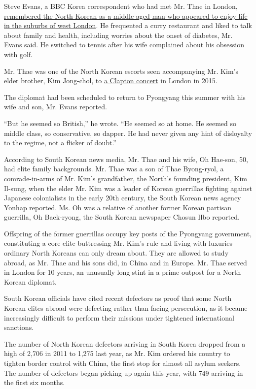 Steve Evans, a BBC Korea correspondent who had met Mr. Thae in London,
\href{http://www.bbc.com/news/magazine-37098904}{remembered the North
Korean as a middle-aged man who appeared to enjoy life in the suburbs of
west London}. He frequented a curry restaurant and liked to talk about
family and health, including worries about the onset of diabetes, Mr.
Evans said. He switched to tennis after his wife complained about his
obsession with golf.

Mr. Thae was one of the North Korean escorts seen accompanying Mr. Kim's
elder brother, Kim Jong-chol, to
\href{http://www.bbc.com/news/world-asia-32843186}{a Clapton concert} in
London in 2015.

The diplomat had been scheduled to return to Pyongyang this summer with
his wife and son, Mr. Evans reported.

``But he seemed so British,'' he wrote. ``He seemed so at home. He
seemed so middle class, so conservative, so dapper. He had never given
any hint of disloyalty to the regime, not a flicker of doubt.''

According to South Korean news media, Mr. Thae and his wife, Oh Hae-son,
50, had elite family backgrounds. Mr. Thae was a son of Thae Byong-ryol,
a comrade-in-arms of Mr. Kim's grandfather, the North's founding
president, Kim Il-sung, when the elder Mr. Kim was a leader of Korean
guerrillas fighting against Japanese colonialists in the early 20th
century, the South Korean news agency Yonhap reported. Ms. Oh was a
relative of another former Korean partisan guerrilla, Oh Baek-ryong, the
South Korean newspaper Chosun Ilbo reported.

Offspring of the former guerrillas occupy key posts of the Pyongyang
government, constituting a core elite buttressing Mr. Kim's rule and
living with luxuries ordinary North Koreans can only dream about. They
are allowed to study abroad, as Mr. Thae and his sons did, in China and
in Europe. Mr. Thae served in London for 10 years, an unusually long
stint in a prime outpost for a North Korean diplomat.

South Korean officials have cited recent defectors as proof that some
North Korean elites abroad were defecting rather than facing
persecution, as it became increasingly difficult to perform their
missions under tightened international sanctions.

The number of North Korean defectors arriving in South Korea dropped
from a high of 2,706 in 2011 to 1,275 last year, as Mr. Kim ordered his
country to tighten border control with China, the first stop for almost
all asylum seekers. The number of defectors began picking up again this
year, with 749 arriving in the first six months.


